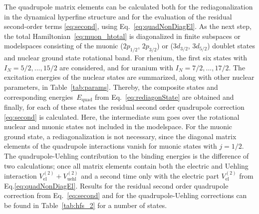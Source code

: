 The quadrupole matrix elements can be calculated both for the rediagonalization in the dynamical hyperfine structure and for the evaluation of the residual second-order terms \eqref{eq:second}, using Eq.~\eqref{eq:quadNonDiagEl}. As the next step, the total Hamiltonian~\eqref{eq:muon_htotal} is diagonalized in finite subspaces or modelspaces consisting of the muonic ($2p_{1/2}$, $2p_{3/2}$) or ($3d_{3/2}$, $3d_{5/2}$) doublet states and nuclear ground state rotational band. For rhenium, the first six states with $I_N =5/2,...,15/2$ are considered, and for uranium with $I_N =7/2,...,17/2$. The excitation energies of the nuclear states are summarized, along with other nuclear parameters, in Table~\ref{tab:params}. Thereby, the composite states and corresponding energies~$E_{\text{quad}}$ from Eq.~\eqref{eq:rediagonState} are obtained and finally, for each of these states the residual second order quadrupole correction \eqref{eq:second} is calculated. Here, the intermediate sum goes over the rotational nuclear and muonic states not included in the modelspace.
For the muonic ground state, a rediagonalization is not necessary, since the diagonal matrix elements of the quadrupole interactions vanish for muonic states with $j=1/2$.
The quadrupole-Uehling contribution to the binding energies is the difference of two calculations; once all matrix elements contain both the electric and Uehling interaction ${V_{\text{el}}^{(2)}}{+}{V_{\text{uehl}}^{(2)}}$ and a second time only with the electric part ${V_{\text{el}}^{(2)}}$ from Eq.\eqref{eq:quadNonDiagEl}. Results for the residual second order quadrupole correction from Eq.~\eqref{eq:second} and for the quadrupole-Uehling corrections can be found in Table~\ref{tab:hfs_2} for a number of states.\\

